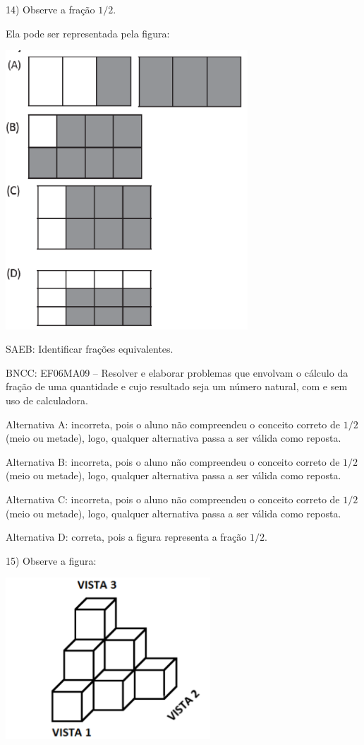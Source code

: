 14) Observe a fração $1/2$.

Ela pode ser representada pela figura:

\includegraphics[width=3.57531in,height=4.10869in]{./imgSAEB_6_MAT/media/image111.png}

SAEB: Identificar frações equivalentes.

BNCC: EF06MA09 -- Resolver e elaborar problemas que envolvam o cálculo
da fração de uma quantidade e cujo resultado seja um número natural, com
e sem uso de calculadora.

Alternativa A: incorreta, pois o aluno não compreendeu o conceito
correto de $1/2$ (meio ou metade), logo, qualquer alternativa passa a ser
válida como reposta.

Alternativa B: incorreta, pois o aluno não compreendeu o conceito
correto de $1/2$ (meio ou metade), logo, qualquer alternativa passa a ser
válida como reposta.

Alternativa C: incorreta, pois o aluno não compreendeu o conceito
correto de $1/2$ (meio ou metade), logo, qualquer alternativa passa a ser
válida como reposta.

Alternativa D: correta, pois a figura representa a fração $1/2$.

15) Observe a figura:

\includegraphics[width=3.01693in,height=2.38354in]{./imgSAEB_6_MAT/media/image112.png}

